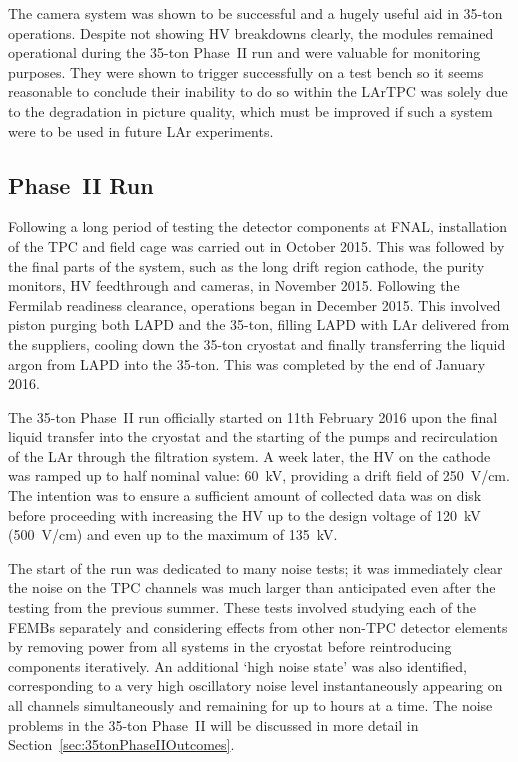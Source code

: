 The camera system was shown to be successful and a hugely useful aid in 35-ton operations.  Despite not showing HV breakdowns clearly, the modules remained operational during the 35-ton Phase~II run and were valuable for monitoring purposes.  They were shown to trigger successfully on a test bench so it seems reasonable to conclude their inability to do so within the LArTPC was solely due to the degradation in picture quality, which must be improved if such a system were to be used in future LAr experiments.

\subsection{Phase~II Run}\label{sec:35tonPhaseIIRun}

Following a long period of testing the detector components at FNAL, installation of the TPC and field cage was carried out in October 2015.  This was followed by the final parts of the system, such as the long drift region cathode, the purity monitors, HV feedthrough and cameras, in November 2015.  Following the Fermilab readiness clearance, operations began in December 2015.  This involved piston purging both LAPD and the 35-ton, filling LAPD with LAr delivered from the suppliers, cooling down the 35-ton cryostat and finally transferring the liquid argon from LAPD into the 35-ton.  This was completed by the end of January 2016.

The 35-ton Phase~II run officially started on 11th February 2016 upon the final liquid transfer into the cryostat and the starting of the pumps and recirculation of the LAr through the filtration system.  A week later, the HV on the cathode was ramped up to half nominal value: 60~kV, providing a drift field of 250~V/cm.  The intention was to ensure a sufficient amount of collected data was on disk before proceeding with increasing the HV up to the design voltage of 120~kV (500~V/cm) and even up to the maximum of 135~kV.

The start of the run was dedicated to many noise tests; it was immediately clear the noise on the TPC channels was much larger than anticipated even after the testing from the previous summer.  These tests involved studying each of the FEMBs separately and considering effects from other non-TPC detector elements by removing power from all systems in the cryostat before reintroducing components iteratively.  An additional `high noise state' was also identified, corresponding to a very high oscillatory noise level instantaneously appearing on all channels simultaneously and remaining for up to hours at a time.  The noise problems in the 35-ton Phase~II will be discussed in more detail in Section~\ref{sec:35tonPhaseIIOutcomes}.

